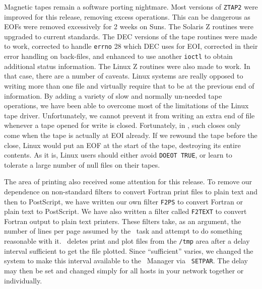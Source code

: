 Magnetic tapes remain a software porting nightmare.  Most versions of
{\tt ZTAP2} were improved for this release, removing excess
operations.  This can be dangerous as EOFs were removed excessively
for 2 weeks on Suns.  The Solaris Z routines were upgraded to current
standards.  The DEC versions of the tape routines were made to work,
corrected to handle {\tt errno} 28 which DEC uses for EOI, corrected
in their error handling on back-files, and enhanced to use another
{\tt ioctl} to obtain additional status information.  The Linux Z
routines were also made to work.  In that case, there are a number of
caveats.  Linux systems are really opposed to writing more than one
file and virtually require that to be at the previous end of
information.  By adding a variety of slow and normally un-needed tape
operations, we have been able to overcome most of the limitations of
the Linux tape driver.  Unfortunately, we cannot prevent it from
writing an extra end of file whenever a tape opened for write is
closed.  Fortunately, in \AIPS, such closes only come when the tape is
actually at EOI already.  If we rewound the tape before the close,
Linux would put an EOF at the start of the tape, destroying its entire
contents.  As it is, Linux users should either avoid {\tt DOEOT TRUE},
or learn to tolerate a large number of null files on their tapes.

The area of printing also received some attention for this release.
To remove our dependence on non-standard filters to convert Fortran
print files to plain text and then to PostScript, we have written our
own filter {\tt F2PS} to convert Fortran or plain text to PostScript.
We have also written a filter called {\tt F2TEXT} to convert Fortran
output to plain text printers.  These filters take, as an argument,
the number of lines per page assumed by the \AIPS\ task and attempt to
do something reasonable with it.  \AIPS\ deletes print and plot files
from the {\tt /tmp} area after a delay interval sufficient to get the
file plotted.  Since ``sufficient'' varies, we changed the system to
make this interval available to the \AIPS\ Manager via \hbox{{\tt
SETPAR}}.  The delay may then be set and changed simply for all hosts
in your network together or individually.


